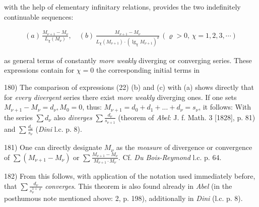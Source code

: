 with the help of elementary infinitary relations, provides the two indefinitely continuable sequences:

\vspace{-0.5cm}
\begin{align}
    (a) \, \frac{M_{\nu+1} - M_\nu}{L_\chi(M_\nu)}, \quad (b) \, \frac{M_{\nu+1} - M_\nu}{L_\chi(M_{\nu+1}) \cdot (\lg_\chi M_{\nu+1})^\varrho} \, (\varrho > 0, \, \chi=1,2,3,\cdots)
\end{align}
\vspace{-0.3cm}

as general terms of constantly \textit{more weakly} diverging or converging series. These expressions contain for $\chi = 0$ the corresponding initial terms in

\vfill
\leftline{\rule{2in}{0.4pt}}
\vspace{0.2cm}
{
\footnotesize
180) The comparison of expressions (22) (b) and (c) with (a) shows directly that for \textit{every divergent} series there exist \textit{more weakly} diverging ones. If one sets $M_{\nu+1} - M_\nu = d_\nu, M_0 = 0$, thus: $M_{\nu+1} = d_0 + d_1 + \ldots + d_\nu = s_\nu$, it follows: With the series $\sum d_\nu$ also \textit{diverges} $\sum \frac{d_\nu}{s_{\nu+1}}$ (theorem of \textit{Abel}: J. f. Math. 3 [1828], p. 81) and $\sum \frac{d_\nu}{s_\nu}$ (\textit{Dini} l.c. p. 8).

181) One can directly designate $M_\nu$ as the \textit{measure} of divergence or convergence of $\sum (M_{\nu+1} - M_\nu)$ or $\sum \frac{M_{\nu+1} - M_\nu}{M_{\nu+1} \cdot M_\nu}$. Cf. \textit{Du Bois-Reymond} l.c. p. 64.

182) From this follows, with application of the notation used immediately before, that $\sum \frac{d_\nu}{s_\nu^{1+\varrho}}$ \textit{converges}. This theorem is also found already in \textit{Abel} (in the posthumous note mentioned above: 2, p. 198), additionally in \textit{Dini} (l.c. p. 8).

}